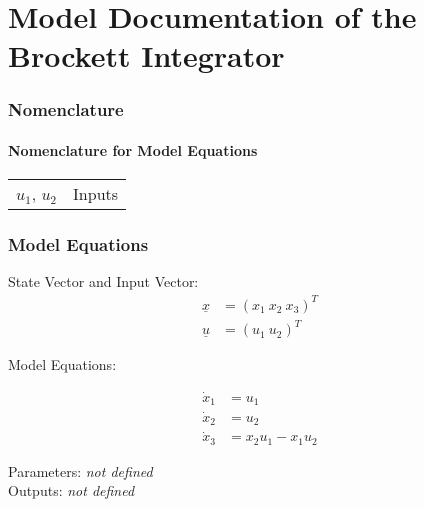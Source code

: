 \documentclass[10pt,a4paper]{article}
\begin{document}
	\part*{Model Documentation of the \\ Brockett Integrator} %
	
	
	\section{Nomenclature} %
	\subsection{Nomenclature for Model Equations} %
	
	\begin{tabular}{ll}
		$u_1$, $u_2$ & Inputs		
	\end{tabular}

	
	\section{Model Equations} %
	
	State Vector and Input Vector:
	\begin{align*}
		\underline{x} &= (x_1 \ x_2 \ x_3)^T  \\
		\underline{u} &= (u_1 \ u_2)^T 
	\end{align*}
	
	
	\noindent Model Equations:
	
	\begin{subequations}
	\begin{align}
		\dot{x}_1 &= u_1 \\      %
		\dot{x}_2 &= u_2 \\
		\dot{x}_3 &= x_2 u_1 - x_1 u_2
	\end{align}
	\end{subequations}

	
	\noindent
	Parameters: \textit{\textlangle not defined\textrangle} 
	\\
	Outputs: \textit{\textlangle not defined\textrangle} 
	
\end{document}
